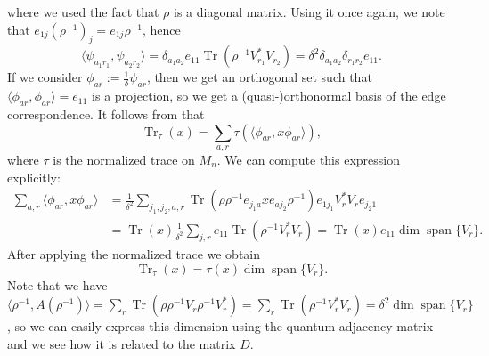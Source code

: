 \documentclass[a4paper,reqno]{amsart}
\numberwithin{equation}{section}
\numberwithin{theorem}{section}
\theoremstyle{definition}\newtheorem{definition}[theorem]{Definition}
\theoremstyle{definition}\newtheorem{remark}[theorem]{Remark}
\theoremstyle{definition}\newtheorem{example}[theorem]{Example}
\theoremstyle{definition}\newtheorem*{notation*}{Notation}
\theoremstyle{definition}\newtheorem*{convention*}{Convention}
\theoremstyle{definition}\newtheorem{observation}{Observation}
\theoremstyle{definition}\newtheorem*{acknowledgment*}{Acknowledgments}
\renewcommand{\op}[1]{\operatorname{#1}}
\begin{document}
where we used the fact that $\rho$ is a diagonal matrix. Using it once again, we note that $e_{1j} (\rho^{-1})_{j} = e_{1j} \rho^{-1}$, hence
\[
\langle \psi_{a_1 r_1}, \psi_{a_2 r_2}\rangle= \delta_{a_1 a_2} e_{11} \op{Tr}(\rho^{-1} V_{r_1}^{\ast} V_{r_2}) = \delta^2 \delta_{a_1 a_2} \delta_{r_1 r_2} e_{11}.
\]
 If we consider $\phi_{ar}:= \frac{1}{\delta} \psi_{ar}$, then we get an orthogonal set such that $\langle \phi_{ar}, \phi_{ar}\rangle = e_{11}$ is a projection, so we get a (quasi-)orthonormal basis of the edge correspondence. It follows from \cite[Theorem 1.1.]{LN} that 
 \[\op{Tr}_{\tau} (x) = \sum_{a,r} \tau(\langle \phi_{ar}, x \phi_{ar}\rangle),\] where $\tau$ is the normalized trace on $M_n$. We can compute this expression explicitly:
\begin{align*}
\sum_{a,r} \langle \phi_{ar}, x\phi_{ar}\rangle &= \frac{1}{\delta^2}\sum_{j_1, j_2, a, r} \op{Tr}(\rho \rho^{-1} e_{j_1 a} x e_{a j_2} \rho^{-1}) e_{1 j_1} V_{r}^{\ast} V_{r} e_{j_2 1} \\
&= \op{Tr}(x) \frac{1}{\delta^2} \sum_{j,r} e_{11} \op{Tr}(\rho^{-1} V_{r}^{\ast} V_{r}) = \op{Tr}(x) e_{11} \op{dim}\op{span}\{V_r\}.
\end{align*} 
After applying the normalized trace we obtain 
\[
\op{Tr}_{\tau}(x) = \tau(x) \op{dim}\op{span}\{V_r\}.
\]
Note that we have $\langle \rho^{-1}, A(\rho^{-1})\rangle = \sum_{r} \op{Tr}(\rho \rho^{-1} V_{r} \rho^{-1} V_{r}^{\ast}) = \sum_{r} \op{Tr}(\rho^{-1} V_{r}^{\ast} V_{r}) = \delta^2 \op{dim}\op{span}\{V_r\}$, so we can easily express this dimension using the quantum adjacency matrix and we see how it is related to the matrix $D$.
\end{document}
